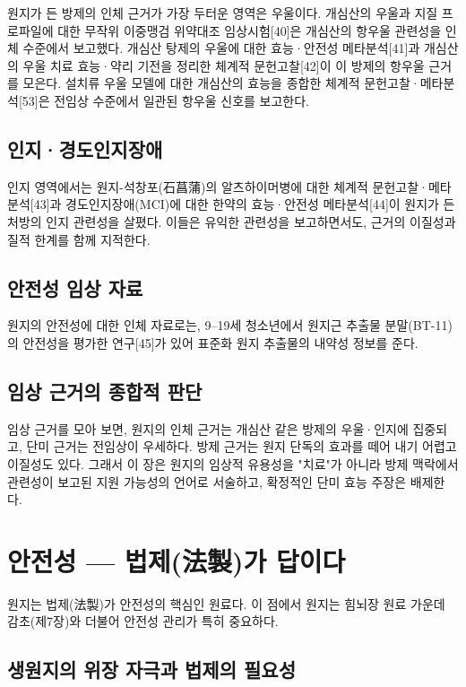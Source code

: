 \documentclass[12pt,oneside]{book}
\begin{document}
원지가 든 방제의 인체 근거가 가장 두터운 영역은 우울이다. 개심산의 우울과 지질 프로파일에 대한 무작위 이중맹검 위약대조 임상시험[40]은 개심산의 항우울 관련성을 인체 수준에서 보고했다. 개심산 탕제의 우울에 대한 효능·안전성 메타분석[41]과 개심산의 우울 치료 효능·약리 기전을 정리한 체계적 문헌고찰[42]이 이 방제의 항우울 근거를 모은다. 설치류 우울 모델에 대한 개심산의 효능을 종합한 체계적 문헌고찰·메타분석[53]은 전임상 수준에서 일관된 항우울 신호를 보고한다.

\subsection{인지·경도인지장애}

인지 영역에서는 원지-석창포(石菖蒲)의 알츠하이머병에 대한 체계적 문헌고찰·메타분석[43]과 경도인지장애(MCI)에 대한 한약의 효능·안전성 메타분석[44]이 원지가 든 처방의 인지 관련성을 살폈다. 이들은 유익한 관련성을 보고하면서도, 근거의 이질성과 질적 한계를 함께 지적한다.

\subsection{안전성 임상 자료}

원지의 안전성에 대한 인체 자료로는, 9–19세 청소년에서 원지근 추출물 분말(BT-11)의 안전성을 평가한 연구[45]가 있어 표준화 원지 추출물의 내약성 정보를 준다.

\subsection{임상 근거의 종합적 판단}

임상 근거를 모아 보면, 원지의 인체 근거는 개심산 같은 방제의 우울·인지에 집중되고, 단미 근거는 전임상이 우세하다. 방제 근거는 원지 단독의 효과를 떼어 내기 어렵고 이질성도 있다. 그래서 이 장은 원지의 임상적 유용성을 "치료"가 아니라 방제 맥락에서 관련성이 보고된 지원 가능성의 언어로 서술하고, 확정적인 단미 효능 주장은 배제한다.

\section{안전성 — 법제(法製)가 답이다}

원지는 법제(法製)가 안전성의 핵심인 원료다. 이 점에서 원지는 힘뇌장 원료 가운데 감초(제7장)와 더불어 안전성 관리가 특히 중요하다.

\subsection{생원지의 위장 자극과 법제의 필요성}
\end{document}

